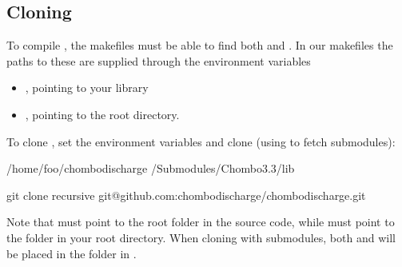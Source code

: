 \documentclass[letterpaper,10pt,english]{sphinxmanual}
\begin{document}
\subsection{Cloning }
\label{\detokenize{Base/GettingStarted:cloning-chombo-discharge}}
To compile , the makefiles must be able to find both  and .
In our makefiles the paths to these are supplied through the environment variables
\begin{itemize}
\item {} 
, pointing to your  library

\item {} 
, pointing to the  root directory.

\end{itemize}

To clone , set the environment variables and clone (using  to fetch submodules):

\begin{sphinxVerbatim}[commandchars=\\\{\},formatcom=\scriptsize]
 /home/foo/chombo\PYGZhy{}discharge
 /Submodules/Chombo\PYGZhy{}3.3/lib

git clone \PYGZhy{}\PYGZhy{}recursive git@github.com:chombo\PYGZhy{}discharge/chombo\PYGZhy{}discharge.git 
\end{sphinxVerbatim}

Note that  must point to the root folder in the  source code, while  must point to the  folder in your  root directory.
When cloning with submodules, both  and  will be placed in the  folder in .
\end{document}
